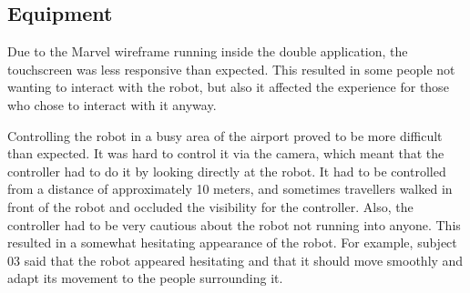 \subsection{Equipment}
Due to the Marvel wireframe running inside the double application, the touchscreen was less responsive than expected. This resulted in some people not wanting to interact with the robot, but also it affected the experience for those who chose to interact with it anyway.

Controlling the robot in a busy area of the airport proved to be more difficult than expected. It was hard to control it via the camera, which meant that the controller had to do it by looking directly at the robot. It had to be controlled from a distance of approximately 10 meters, and sometimes travellers walked in front of the robot and occluded the visibility for the controller. Also, the controller had to be very cautious about the robot not running into anyone. This resulted in a somewhat hesitating appearance of the robot. For example, subject 03 said that the robot appeared hesitating and that it should move smoothly and adapt its movement to the people surrounding it.